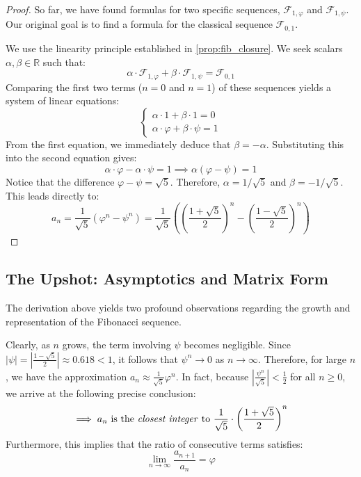 \begin{proof}
So far, we have found formulas for two specific sequences, $\mathcal{F}_{1, \varphi}$ and $\mathcal{F}_{1, \psi}$. Our original goal is to find a formula for the classical sequence $\mathcal{F}_{0,1}$. 

We use the linearity principle established in \cref{prop:fib_closure}. We seek scalars $\alpha, \beta \in \mathbb{R}$ such that:
\[
\alpha \cdot \mathcal{F}_{1, \varphi} + \beta \cdot \mathcal{F}_{1, \psi} = \mathcal{F}_{0,1}
\]
Comparing the first two terms ($n=0$ and $n=1$) of these sequences yields a system of linear equations:
\begin{equation}
\begin{cases}
\alpha \cdot 1 + \beta \cdot 1 = 0 \\
\alpha \cdot \varphi + \beta \cdot \psi = 1
\end{cases}
\end{equation}
From the first equation, we immediately deduce that $\beta = -\alpha$. Substituting this into the second equation gives:
\[
\alpha \cdot \varphi - \alpha \cdot \psi = 1 \implies \alpha (\varphi - \psi) = 1
\]
Notice that the difference $\varphi - \psi = \sqrt{5}$. Therefore, $\alpha = 1/\sqrt{5}$ and $\beta = -1/\sqrt{5}$. This leads directly to:
\[
a_n = \frac{1}{\sqrt{5}} (\varphi^n - \psi^n) = \frac{1}{\sqrt{5}} \left( \left(\frac{1+\sqrt{5}}{2}\right)^n - \left(\frac{1-\sqrt{5}}{2}\right)^n \right)
\]
\end{proof}

\subsection{The Upshot: Asymptotics and Matrix Form}

The derivation above yields two profound observations regarding the growth and representation of the Fibonacci sequence.

\begin{importantremark}
Clearly, as $n$ grows, the term involving $\psi$ becomes negligible. Since $|\psi| = |\frac{1-\sqrt{5}}{2}| \approx 0.618 < 1$, it follows that $\psi^n \to 0$ as $n \to \infty$. Therefore, for large $n$, we have the approximation $a_n \approx \frac{1}{\sqrt{5}} \varphi^n$. In fact, because $\left| \frac{\psi^n}{\sqrt{5}} \right| < \frac{1}{2}$ for all $n \ge 0$, we arrive at the following precise conclusion:
\[
\implies a_n \text{ is the \textit{closest integer} to } \frac{1}{\sqrt{5}} \cdot \left(\frac{1+\sqrt{5}}{2}\right)^n
\]
Furthermore, this implies that the ratio of consecutive terms satisfies:
\begin{equation}
\lim_{n \to \infty} \frac{a_{n+1}}{a_n} = \varphi
\end{equation}
\end{importantremark}

